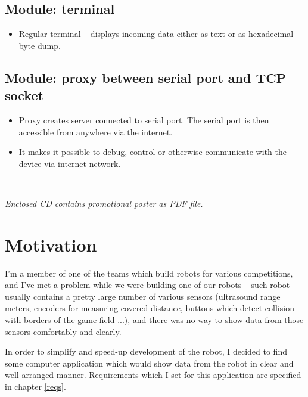 \documentclass[12pt, a4paper, oneside]{article}
\newcommand{\It}{\textit}  %
\begin{document}
\subsection*{Module: terminal}
\begin{itemize}
    \item Regular terminal -- displays incoming data either as text or as hexadecimal byte dump.
\end{itemize}

\subsection*{Module: proxy between serial port and TCP socket}
\begin{itemize}
    \item Proxy creates server connected to serial port. The serial port is then accessible from anywhere via the internet.
    \item It makes it possible to debug, control or otherwise communicate with the device via internet network.
\end{itemize}
~
\vspace{10mm}

\noindent\It{Enclosed CD contains promotional poster as PDF file.}

\newpage
\section{Motivation}
\label{motivace}
I'm a member of one of the teams which build robots for various competitions, and I've met a problem while we were building one of our robots -- such robot usually contains a pretty large number of various sensors (ultrasound range meters, encoders for measuring covered distance, buttons which detect collision with borders of the game field ...), and there was no way to show data from those sensors comfortably and clearly.

In order to simplify and speed-up development of the robot, I decided to find some computer application which would show data from the robot in clear and well-arranged manner. Requirements which I set for this application are specified in chapter \ref{reqs}.
\end{document}
